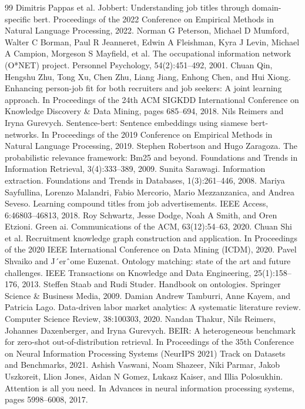 \begin{thebibliography}{99}
 Dimitris Pappas et al. Jobbert: Understanding job titles through domain-specific bert. Proceedings of the 2022 Conference on Empirical Methods in Natural Language Processing, 2022.
 Norman G Peterson, Michael D Mumford, Walter C Borman, Paul R Jeanneret, Edwin A Fleishman, Kyra J Levin, Michael A Campion, Morgeson S Mayfield, et al. The occupational information network (O*NET) project. Personnel Psychology, 54(2):451--492, 2001.
 Chuan Qin, Hengshu Zhu, Tong Xu, Chen Zhu, Liang Jiang, Enhong Chen, and Hui Xiong. Enhancing person-job fit for both recruiters and job seekers: A joint learning approach. In Proceedings of the 24th ACM SIGKDD International Conference on Knowledge Discovery \& Data Mining, pages 685--694, 2018.
 Nils Reimers and Iryna Gurevych. Sentence-bert: Sentence embeddings using siamese bert-networks. In Proceedings of the 2019 Conference on Empirical Methods in Natural Language Processing, 2019.
 Stephen Robertson and Hugo Zaragoza. The probabilistic relevance framework: Bm25 and beyond. Foundations and Trends in Information Retrieval, 3(4):333--389, 2009.
 Sunita Sarawagi. Information extraction. Foundations and Trends in Databases, 1(3):261--446, 2008.
 Mariya Sayfullina, Lorenzo Malandri, Fabio Mercorio, Mario Mezzanzanica, and Andrea Seveso. Learning compound titles from job advertisements. IEEE Access, 6:46803--46813, 2018.
 Roy Schwartz, Jesse Dodge, Noah A Smith, and Oren Etzioni. Green ai. Communications of the ACM, 63(12):54--63, 2020.
 Chuan Shi et al. Recruitment knowledge graph construction and application. In Proceedings of the 2020 IEEE International Conference on Data Mining (ICDM), 2020.
 Pavel Shvaiko and J´erˆome Euzenat. Ontology matching: state of the art and future challenges. IEEE Transactions on Knowledge and Data Engineering, 25(1):158--176, 2013.
 Steffen Staab and Rudi Studer. Handbook on ontologies. Springer Science \& Business Media, 2009.
 Damian Andrew Tamburri, Anne Kayem, and Patricia Lago. Data-driven labor market analytics: A systematic literature review. Computer Science Review, 38:100303, 2020.
 Nandan Thakur, Nils Reimers, Johannes Daxenberger, and Iryna Gurevych. BEIR: A heterogeneous benchmark for zero-shot out-of-distribution retrieval. In Proceedings of the 35th Conference on Neural Information Processing Systems (NeurIPS 2021) Track on Datasets and Benchmarks, 2021.
 Ashish Vaswani, Noam Shazeer, Niki Parmar, Jakob Uszkoreit, Llion Jones, Aidan N Gomez, Lukasz Kaiser, and Illia Polosukhin. Attention is all you need. In Advances in neural information processing systems, pages 5998--6008, 2017.

\end{thebibliography}
